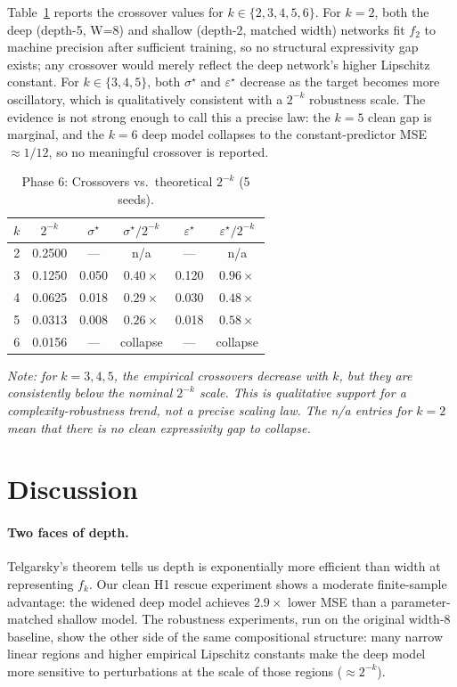 \documentclass[10pt,twocolumn]{article}
\newcommand{\epst}{\varepsilon^\star}
\newcommand{\sigt}{\sigma^\star}
\begin{document}
Table~\ref{tab:scaling} reports the crossover values for $k \in \{2,3,4,5,6\}$.
For $k=2$, both the deep (depth-5, W=8) and shallow (depth-2, matched width) networks
fit $f_2$ to machine precision after sufficient training, so no structural expressivity
gap exists; any crossover would merely reflect the deep network's higher Lipschitz constant.
For $k \in \{3,4,5\}$, both $\sigt$ and $\epst$ decrease as the target becomes more
oscillatory, which is qualitatively consistent with a $2^{-k}$ robustness scale. The
evidence is not strong enough to call this a precise law: the $k=5$ clean gap is marginal,
and the $k=6$ deep model collapses to the constant-predictor MSE $\approx 1/12$, so no
meaningful crossover is reported.

\begin{table}[h]
\scriptsize
\centering
\caption{Phase 6: Crossovers vs.\ theoretical $2^{-k}$ (5 seeds).}
\label{tab:scaling}
\setlength{\tabcolsep}{2.5pt}
\begin{tabular}{cccccc}
\toprule
$k$ & $2^{-k}$ & $\sigt$ & $\sigt/2^{-k}$ & $\epst$ & $\epst/2^{-k}$ \\
\midrule
2    & 0.2500 & ---   & n/a           & ---   & n/a           \\
3    & 0.1250 & 0.050 & $0.40\times$        & 0.120 & $0.96\times$        \\
4    & 0.0625 & 0.018 & $0.29\times$        & 0.030 & $0.48\times$        \\
5    & 0.0313 & 0.008 & $0.26\times$        & 0.018 & $0.58\times$        \\
6    & 0.0156 & ---   & collapse      & ---   & collapse      \\
\bottomrule
\end{tabular}
\end{table}

\noindent\textit{Note: for $k=3,4,5$, the empirical crossovers decrease with $k$, but
they are consistently below the nominal $2^{-k}$ scale. This is qualitative support for
a complexity-robustness trend, not a precise scaling law. The n/a entries for $k=2$
mean that there is no clean expressivity gap to collapse.}

\section{Discussion}
\label{sec:discussion}

\paragraph{Two faces of depth.}
Telgarsky's theorem tells us depth is exponentially more efficient than width at representing
$f_k$. Our clean H1 rescue experiment shows a moderate finite-sample advantage: the widened
deep model achieves $2.9\times$ lower MSE than a parameter-matched shallow model. The
robustness experiments, run on the original width-8 baseline, show the other side of the
same compositional structure: many narrow linear regions and higher empirical Lipschitz
constants make the deep model more sensitive to perturbations at the scale of those regions
($\approx 2^{-k}$).
\end{document}

